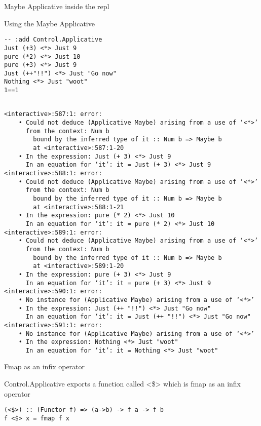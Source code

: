 \documentclass[presetation]{beamer}
\begin{document}
\begin{frame}[fragile,label={sec:org12d88ee}]{Maybe Applicative inside the repl}
 \begin{block}{Using the Maybe Applicative}
\begin{verbatim}
-- :add Control.Applicative
Just (+3) <*> Just 9
pure (*2) <*> Just 10
pure (+3) <*> Just 9
Just (++"!!") <*> Just "Go now"
Nothing <*> Just "woot"
1==1
\end{verbatim}

\begin{verbatim}

<interactive>:587:1: error:
    • Could not deduce (Applicative Maybe) arising from a use of ‘<*>’
      from the context: Num b
        bound by the inferred type of it :: Num b => Maybe b
        at <interactive>:587:1-20
    • In the expression: Just (+ 3) <*> Just 9
      In an equation for ‘it’: it = Just (+ 3) <*> Just 9
<interactive>:588:1: error:
    • Could not deduce (Applicative Maybe) arising from a use of ‘<*>’
      from the context: Num b
        bound by the inferred type of it :: Num b => Maybe b
        at <interactive>:588:1-21
    • In the expression: pure (* 2) <*> Just 10
      In an equation for ‘it’: it = pure (* 2) <*> Just 10
<interactive>:589:1: error:
    • Could not deduce (Applicative Maybe) arising from a use of ‘<*>’
      from the context: Num b
        bound by the inferred type of it :: Num b => Maybe b
        at <interactive>:589:1-20
    • In the expression: pure (+ 3) <*> Just 9
      In an equation for ‘it’: it = pure (+ 3) <*> Just 9
<interactive>:590:1: error:
    • No instance for (Applicative Maybe) arising from a use of ‘<*>’
    • In the expression: Just (++ "!!") <*> Just "Go now"
      In an equation for ‘it’: it = Just (++ "!!") <*> Just "Go now"
<interactive>:591:1: error:
    • No instance for (Applicative Maybe) arising from a use of ‘<*>’
    • In the expression: Nothing <*> Just "woot"
      In an equation for ‘it’: it = Nothing <*> Just "woot"
\end{verbatim}
\end{block}
\end{frame}


\begin{frame}[fragile,label={sec:orgdc1d982}]{Fmap as an infix operator}
 \begin{block}{Control.Applicative exports a function called <\$>}
which is fmap as an infix operator
\begin{verbatim}
(<$>) :: (Functor f) => (a->b) -> f a -> f b
f <$> x = fmap f x
\end{verbatim}
\end{block}
\end{frame}
\end{document}
